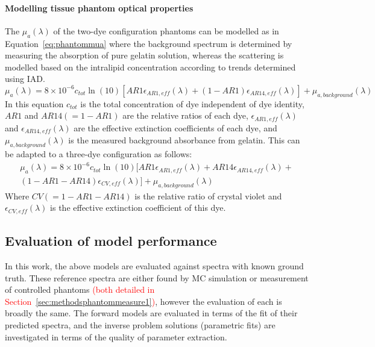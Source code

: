 \paragraph{Modelling tissue phantom optical properties}\label{sec:methodphantommodel}
The $\mu_a(\lambda)$ of the two-dye configuration phantoms can be modelled as in Equation~\eqref{eq:phantommua} where the background spectrum is determined by measuring the absorption of pure gelatin solution, whereas the scattering is modelled based on the intralipid concentration according to trends determined using IAD. 
\begin{equation}
    \mu_{a}(\lambda) = 8\times10^{-6}c_{tot}\ln(10)[AR1 \epsilon_{AR1, eff}(\lambda) + 
    (1 - AR1)
    \epsilon_{AR14, eff}(\lambda)] + \mu_{a, background}(\lambda)
    \label{eq:phantommua} %
\end{equation}
In this equation $c_{tot}$ is the total concentration of dye independent of dye identity, $AR1$ and 
$AR14 (=1-AR1)$
are the relative ratios of each dye, $\epsilon_{AR1, eff}(\lambda)$ and $\epsilon_{AR14, eff}(\lambda)$ are the effective extinction coefficients of each dye, and  $\mu_{a, background}(\lambda)$ is the measured background absorbance from gelatin. This can be adapted to a three-dye configuration as follows: 
\begin{multline}
    \mu_{a}(\lambda) = 8\times10^{-6}c_{tot}\ln(10)[AR1 \epsilon_{AR1, eff}(\lambda) + AR14\epsilon_{AR14, eff}(\lambda) +\\
    (1 - AR1 - AR14)\epsilon_{CV, eff}(\lambda)] + \mu_{a, background}(\lambda)
    \label{eq:phantommua3}
\end{multline}
Where 
$CV (=1-AR1-AR14) $
is the relative ratio of crystal violet and $\epsilon_{CV, eff}(\lambda)$ is the effective extinction coefficient of this dye.

\subsection{Evaluation of model performance}\label{sec:methodevaluate}
In this work, the above models are evaluated against spectra with known ground truth. These reference spectra are either found by MC simulation or measurement of controlled phantoms \textcolor{red}{(both detailed in Section~\ref{sec:methodsphantommeasure1})}, however the evaluation of each is broadly the same. The forward models are evaluated in terms of the fit of their predicted spectra, and the inverse problem solutions (parametric fits) are investigated in terms of the quality of parameter extraction. 

